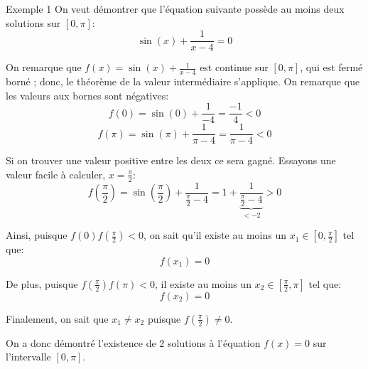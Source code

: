 \documentclass[a4paper]{article}
\begin{document}
\begin{parag}{Exemple 1}
    On veut démontrer que l'équation suivante possède au moins deux solutions sur $\left[0, \pi\right]$:
    \[\sin\left(x\right) + \frac{1}{x - 4} = 0\]
    
    On remarque que $f\left(x\right) = \sin\left(x\right) + \frac{1}{x-4}$ est continue sur $\left[0, \pi\right]$, qui est fermé borné ; donc, le théorème de la valeur intermédiaire s'applique. On remarque que les valeurs aux bornes sont négatives: 
    \[f\left(0\right) = \sin\left(0\right) + \frac{1}{-4} = \frac{-1}{4} < 0\]
    \[f\left(\pi\right) = \sin\left(\pi\right) + \frac{1}{\pi - 4} = \frac{1}{\pi - 4} < 0\]
    
    Si on trouver une valeur positive entre les deux ce sera gagné. Essayons une valeur facile à calculer, $x = \frac{\pi}{2}$: 
    \[f\left(\frac{\pi}{2}\right) = \sin\left(\frac{\pi}{2}\right) + \frac{1}{\frac{\pi}{2} - 4} = 1 + \frac{1}{\underbrace{\frac{\pi}{2} - 4}_{< -2}} > 0\] 
    
    Ainsi, puisque $f\left(0\right)f\left(\frac{\pi}{2}\right) < 0$, on sait qu'il existe au moins un $x_1 \in \left[0, \frac{\pi}{2}\right]$ tel que: 
    \[f\left(x_1\right) = 0\]
    
    De plus, puisque $f\left(\frac{\pi}{2}\right)f\left(\pi\right) < 0$, il existe au moins un $x_2 \in \left[\frac{\pi}{2}, \pi\right]$ tel que: 
    \[f\left(x_2\right) = 0\]
    
    Finalement, on sait que $x_1 \neq x_2$ puisque $f\left(\frac{\pi}{2}\right) \neq 0$. 

    On a donc démontré l'existence de 2 solutions à l'équation $f\left(x\right) = 0$ sur l'intervalle $\left[0, \pi\right]$.
\end{parag}
\end{document}
